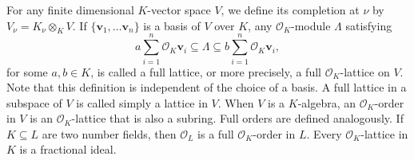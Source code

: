\documentclass{article}
\theoremstyle{definition}
\theoremstyle{remark}
\begin{document}
For any finite dimensional $K$-vector space $V$, we define its 
completion at $\nu$ by $V_{\nu}=K_{\nu}\otimes_KV$. If $\{\mathbf{v}_1,\dots
\mathbf{v}_n\}$ is a basis of $V$ over $K$, any $\mathcal{O}_K$-module
$\Lambda$ satisfying 
$$a\sum_{i=1}^n\mathcal{O}_K\mathbf{v}_i\subseteq\Lambda
\subseteq b\sum_{i=1}^n\mathcal{O}_K\mathbf{v}_i,$$
for some $a,b\in K$,
is called a full lattice, or more precisely, a full
$\mathcal{O}_K$-lattice on $V$. Note that this definition 
is independent of the choice of a basis. A full lattice
in a subspace of $V$ is called simply a lattice in $V$.
When $V$ is a $K$-algebra, an $\mathcal{O}_K$-order in $V$
is an $\mathcal{O}_K$-lattice that is also a subring.
Full orders are defined analogously. If $K\subseteq L$
are two number fields, then $\mathcal{O}_L$ is a full 
$\mathcal{O}_K$-order in $L$. Every $\mathcal{O}_K$-lattice
in $K$ is a fractional ideal.
\end{document}
